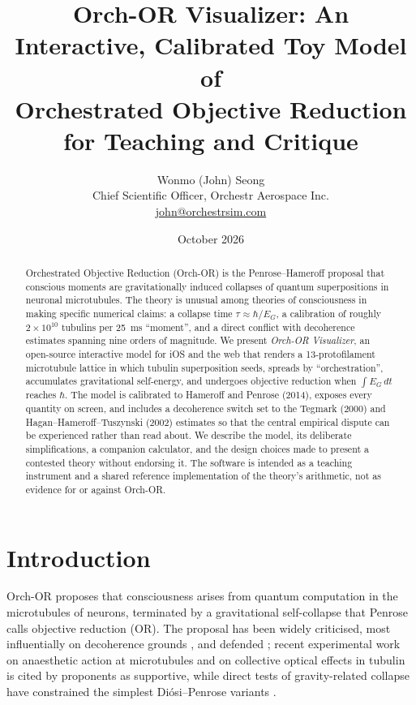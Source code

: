 \documentclass[11pt]{article}
\title{Orch-OR Visualizer: An Interactive, Calibrated Toy Model of\\Orchestrated Objective Reduction for Teaching and Critique}
\author{Wonmo (John) Seong\\ \small Chief Scientific Officer, Orchestr Aerospace Inc.\\ \small \href{mailto:john@orchestrsim.com}{john@orchestrsim.com}}
\date{October 2026}
\begin{document}
\maketitle

\begin{abstract}
Orchestrated Objective Reduction (Orch-OR) is the Penrose--Hameroff proposal that conscious moments are gravitationally induced collapses of quantum superpositions in neuronal microtubules. The theory is unusual among theories of consciousness in making specific numerical claims: a collapse time $\tau \approx \hbar/E_G$, a calibration of roughly $2\times10^{10}$ tubulins per 25~ms ``moment'', and a direct conflict with decoherence estimates spanning nine orders of magnitude. We present \emph{Orch-OR Visualizer}, an open-source interactive model for iOS and the web that renders a 13-protofilament microtubule lattice in which tubulin superposition seeds, spreads by ``orchestration'', accumulates gravitational self-energy, and undergoes objective reduction when $\int E_G\,dt$ reaches $\hbar$. The model is calibrated to Hameroff and Penrose (2014), exposes every quantity on screen, and includes a decoherence switch set to the Tegmark (2000) and Hagan--Hameroff--Tuszynski (2002) estimates so that the central empirical dispute can be experienced rather than read about. We describe the model, its deliberate simplifications, a companion calculator, and the design choices made to present a contested theory without endorsing it. The software is intended as a teaching instrument and a shared reference implementation of the theory's arithmetic, not as evidence for or against Orch-OR.
\end{abstract}

\section{Introduction}
Orch-OR \citep{penrose1989,penrose1994,hameroff1996,hameroff2014} proposes that consciousness arises from quantum computation in the microtubules of neurons, terminated by a gravitational self-collapse that Penrose calls objective reduction (OR). The proposal has been widely criticised, most influentially on decoherence grounds \citep{tegmark2000,koch2006}, and defended \citep{hagan2002}; recent experimental work on anaesthetic action at microtubules \citep{khan2024} and on collective optical effects in tubulin \citep{babcock2024,kalra2023} is cited by proponents as supportive, while direct tests of gravity-related collapse have constrained the simplest Di\'osi--Penrose variants \citep{donadi2021}.
\end{document}
